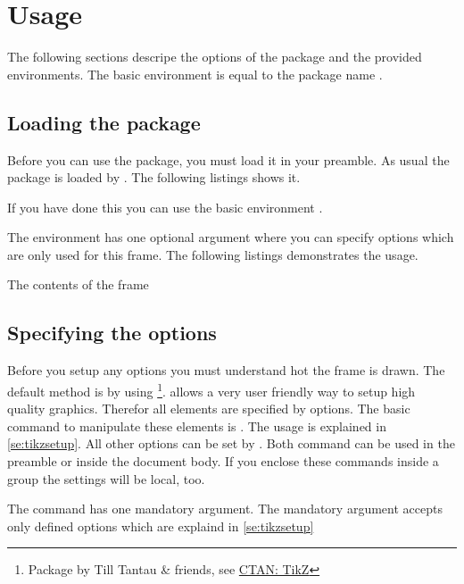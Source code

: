 \documentclass[openany,12pt,tocdepth=3]{ltx-md}
\begin{document}
\chapter{Usage}\label{chap:usage}
The following sections descripe the options of the package and the provided 
environments. The basic environment is equal to the package name .

\section{Loading the package}
Before you can use the package, you must load it in your preamble. As usual the 
package is loaded by . The following listings shows it.
\begin{ltxexample}[caption=Loading the package,label=loading]
 \usepackage{xframed}
\end{ltxexample}
If you have done this you can use the basic environment .

The environment has one optional argument where you can specify options
which are only used for this frame. The following listings demonstrates the usage.
\begin{ltxexample}[caption=Loading the package,label=loading]
 \begin{xframed}
   The contents of the frame
 \end{xframed}
\end{ltxexample}

\section{Specifying the options}
Before you setup any options you must understand hot the frame is drawn.
The default method is by using \footnote{Package  by 
Till Tantau \& friends, see \href{http://www.ctan.org/pkg/pgf}{CTAN: TikZ}}. 
 allows a very user friendly way to setup high quality graphics. 
Therefor all elements are specified by  options. The basic command
to manipulate these elements is . The usage is explained
in \autoref{se:tikzsetup}.  All other options can be set by . 
Both command can be used in the preamble or inside the document body. If
you enclose these commands inside a group the settings will be local, too.
 
The command has one mandatory argument. The mandatory argument accepts only
defined options which are explaind in \autoref{se:tikzsetup}
\end{document}
